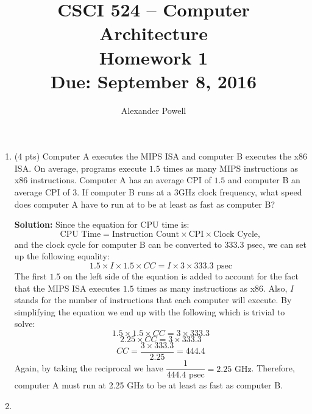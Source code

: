 \documentclass[10pt]{article} %
\title{CSCI 524 -- Computer Architecture \\
Homework 1 \\
{\large{\bf Due: September 8, 2016}}}
\date{}
\author{Alexander Powell}
\begin{document}
\maketitle
\begin{enumerate}

\item 

(4 pts) Computer A executes the MIPS ISA and computer B executes the x86 ISA. On average, programs execute $1.5$ times as many MIPS instructions as x86 instructions. Computer A has an average CPI of $1.5$ and computer B an average CPI of $3$. If computer B runs at a 3GHz clock frequency, what speed does computer A have to run at to be at least as fast as computer B?

\textbf{Solution: }
Since the equation for CPU time is:
$$ \text{CPU Time} = \text{Instruction Count} \times \text{CPI} \times \text{Clock Cycle}, $$
and the clock cycle for computer B can be converted to 333.3 psec, we can set up the following equality:
$$ 1.5 \times I \times 1.5 \times CC = I \times 3 \times 333.3\text{ psec} $$
The first $1.5$ on the left side of the equation is added to account for the fact that the MIPS ISA executes $1.5$ times as many instructions as x86.  Also, $I$ stands for the number of instructions that each computer will execute.  By simplifying the equation we end up with the following which is trivial to solve:
$$ 1.5 \times 1.5 \times CC = 3 \times 333.3 $$
$$ 2.25 \times CC = 3 \times 333.3 $$
$$ CC = \dfrac{3 \times 333.3}{2.25} = 444.4 $$
Again, by taking the reciprocal we have $\dfrac{1}{444.4\text{ psec}} = 2.25 \text{ GHz}$.  Therefore, computer A must run at 2.25 GHz to be at least as fast as computer B.  

\item 


\end{enumerate}
\end{document}
